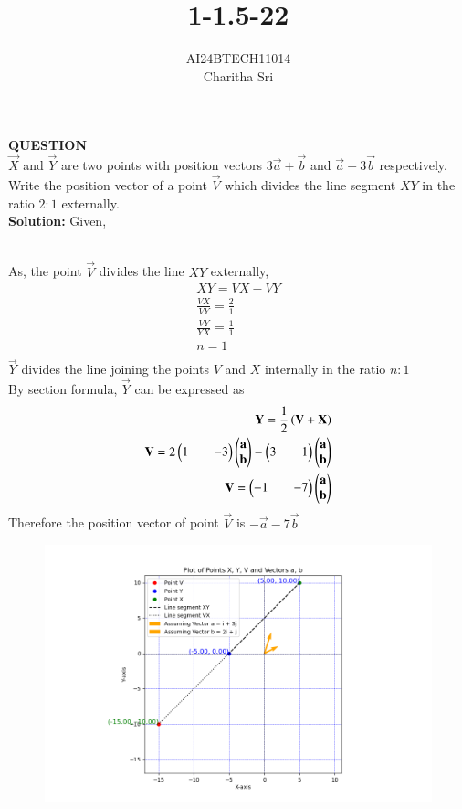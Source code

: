 \documentclass[journal]{IEEEtran}
\numberwithin{equation}{enumi}
\numberwithin{figure}{enumi}
\begin{document}


\title{1-1.5-22}
\author{AI24BTECH11014 \\ Charitha Sri}

{\let\newpage\relax\maketitle}

\textbf{QUESTION} \\$\vec{X}$ and $\vec{Y}$ are two points with position vectors $3\overrightarrow{a}+ \overrightarrow{b}$ and $\overrightarrow{a}-3\overrightarrow{b}$ respectively. Write
the position vector of a point $\vec{V}$ which divides the line segment $XY$ in the ratio $2 : 1$ externally.\\
\textbf{Solution:} Given,\\
\begin{table}[h!]    
  \centering

  \label{table: 1-1.5-22}
  \end{table}\\
 As, the point $\vec{V}$ divides the line $XY$ externally,
\begin{align}
XY = VX - VY \\
\frac{VX}{VY}=\frac{2}{1}\\
\frac{VY}{YX}=\frac{1}{1}\\
 n = 1 \\
\end{align}
$\vec{Y}$ divides the line joining the points $V$ and $X$ internally in the ratio $n : 1$ \\
By section formula, $\vec{Y}$ can be expressed as\\ 
\begin{align}
\mathbf{Y}=\frac{1}{2}\left(\mathbf{V}+\mathbf{X}\right)\\
 \mathbf{V} = 2\begin{pmatrix} 1 && -3\end{pmatrix}\begin{pmatrix} \mathbf{a} \\ \mathbf{b}\end{pmatrix} - \begin{pmatrix}3 && 1\end{pmatrix}\begin{pmatrix}\mathbf{a} \\ \mathbf{b}\end{pmatrix}\\
 \mathbf{V}= \begin{pmatrix}-1 && -7\end{pmatrix}\begin{pmatrix}\mathbf{a} \\ \mathbf{b}\end{pmatrix} \\
\end{align}
 Therefore the position vector of point $\vec{V}$ is $-\overrightarrow{a}-7\overrightarrow{b}$
\begin{figure}[ht]
        \centering
        \includegraphics[width=0.7\linewidth]{figs/fig.png}
        \caption{}
        \label{graph}
\end{figure}
\end{document}
